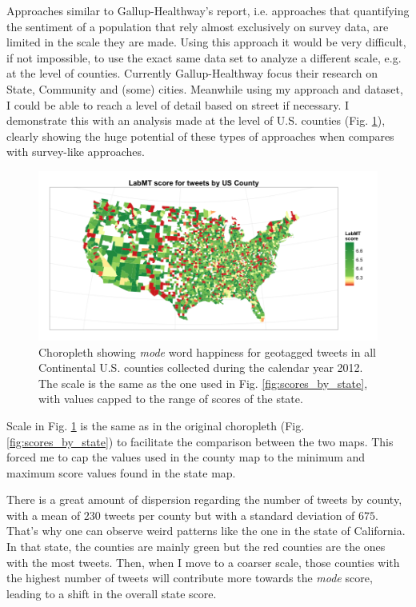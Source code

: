 \documentclass{llncs}
\begin{document}
Approaches similar to Gallup-Healthway's report, i.e. approaches that quantifying the sentiment of a population that rely almost exclusively on survey data, are limited in the scale they are made. Using this approach it would be very difficult, if not impossible, to use the exact same data set to analyze a different scale, e.g. at the level of counties. Currently Gallup-Healthway focus their research on State, Community and (some) cities. Meanwhile using my approach and dataset, I could be able to reach a level of detail based on street if necessary. I demonstrate this with an analysis made at the level of U.S. counties (Fig. \ref{fig:scores_by_county}), clearly showing the huge potential of these types of approaches when compares with survey-like approaches.

\begin{figure}
\centering
\includegraphics[width=\textwidth]{images/scores_by_county}
\caption{Choropleth showing \emph{mode} word happiness for geotagged tweets in all Continental U.S. counties collected during the calendar year 2012. The scale is the same as the one used in Fig. \ref{fig:scores_by_state}, with values capped to the range of scores of the state.}
\label{fig:scores_by_county}
\end{figure}

Scale in Fig. \ref{fig:scores_by_county} is the same as in the original choropleth (Fig. \ref{fig:scores_by_state}) to facilitate the comparison between the two maps. This forced me to cap the values used in the county map to the minimum and maximum score values found in the state map.

There is a great amount of dispersion regarding the number of tweets by county, with a mean of $230$ tweets per county but with a standard deviation of $675$. That's why one can observe weird patterns like the one in the state of California. In that state, the counties are mainly green but the red counties are the ones with the most tweets. Then, when I move to a coarser scale, those counties with the highest number of tweets will contribute more towards the \emph{mode} score, leading to a shift in the overall state score.
\end{document}
